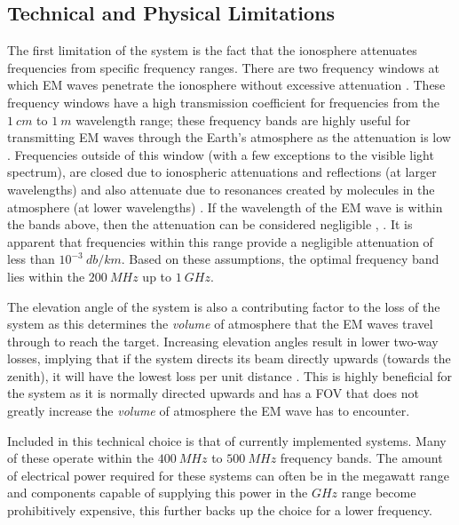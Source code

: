 \documentclass[11pt]{witseiepaper}
\begin{document}
\begin{bibunit}[witseie]
\subsection{Technical and Physical Limitations} \label{sec:TechnicalandPhysicalLimitations}
The first limitation of the system is the fact that the ionosphere attenuates frequencies from specific frequency ranges. There are two frequency windows at which EM waves penetrate the ionosphere without excessive attenuation \cite{ObjectInformation}.
These frequency windows have a high transmission coefficient for frequencies from the $1~cm$ to $1~m$ wavelength range; these frequency bands are highly useful for transmitting EM waves through the Earth's atmosphere as the attenuation is low \cite{frequencyAttenuation}. Frequencies outside of this window (with a few exceptions to the visible light spectrum), are closed due to ionospheric attenuations and reflections (at larger wavelengths) and also attenuate due to resonances created by molecules in the atmosphere (at lower wavelengths) \cite{frequencyAttenuation}.  
If the wavelength of the EM wave is within the bands above, then the attenuation can be considered negligible \cite{ionosphereAttenuationStandard}, \cite[p.~15,124]{radarHandbook}. It is apparent that frequencies within this range provide a negligible attenuation of less than $10^{-3}~db/km$.
Based on these assumptions, the optimal frequency band lies within the $200~MHz$ up to $1~GHz$. %

The elevation angle of the system is also a contributing factor to the loss of the system as this determines the \textit{volume} of atmosphere that the EM waves travel through to reach the target. Increasing elevation angles result in lower two-way losses, implying that if the system directs its beam directly upwards (towards the zenith), it will have the lowest loss per unit distance \cite[p.~70]{elevationLoss}. This is highly beneficial for the system as it is normally directed upwards and has a FOV that does not greatly increase the \textit{volume} of atmosphere the EM wave has to encounter.


Included in this technical choice is that of currently implemented systems. Many of these operate within the $400~MHz$ to $500~MHz$ frequency bands.
The amount of electrical power required for these systems can often be in the megawatt range and components capable of supplying this power in the $GHz$ range become prohibitively expensive, this further backs up the choice for a lower frequency.


\end{bibunit}
\end{document}
